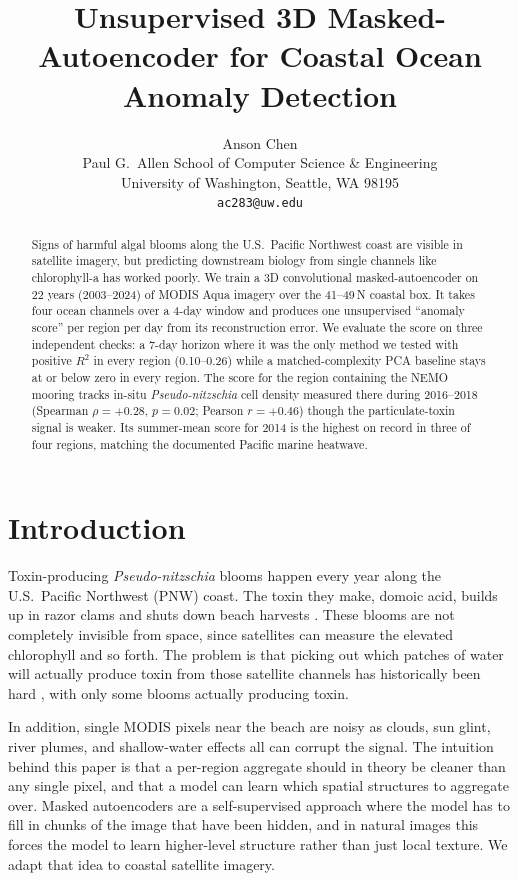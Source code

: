\documentclass[10pt,twocolumn,letterpaper]{article}
\title{Unsupervised 3D Masked-Autoencoder for Coastal Ocean Anomaly Detection}
\author{Anson Chen\\
Paul G.\ Allen School of Computer Science \& Engineering\\
University of Washington, Seattle, WA 98195\\
{\tt\small ac283@uw.edu}}
\begin{document}
\maketitle

\begin{abstract}
Signs of harmful algal blooms along the U.S.\ Pacific Northwest coast are visible in satellite imagery, but predicting downstream biology from single channels like chlorophyll-a has worked poorly. We train a 3D convolutional masked-autoencoder on 22 years (2003--2024) of MODIS Aqua imagery over the 41--49\textdegree\,N coastal box. It takes four ocean channels over a 4-day window and produces one unsupervised ``anomaly score'' per region per day from its reconstruction error. We evaluate the score on three independent checks: a 7-day horizon where it was the only method we tested with positive $R^2$ in every region (0.10--0.26) while a matched-complexity PCA baseline stays at or below zero in every region. The score for the region containing the NEMO mooring tracks in-situ \textit{Pseudo-nitzschia} cell density measured there during 2016--2018 (Spearman $\rho{=}{+}0.28$, $p{=}0.02$; Pearson $r{=}{+}0.46$) though the particulate-toxin signal is weaker. Its summer-mean score for 2014 is the highest on record in three of four regions, matching the documented Pacific marine heatwave.
\end{abstract}

\section{Introduction}
\label{sec:intro}

Toxin-producing \textit{Pseudo-nitzschia} blooms happen every year along the U.S.\ Pacific Northwest (PNW) coast. The toxin they make, domoic acid, builds up in razor clams and shuts down beach harvests \cite{Trainer2009,McCabe2023}. These blooms are not completely invisible from space, since satellites can measure the elevated chlorophyll and so forth. The problem is that picking out which patches of water will actually produce toxin from those satellite channels has historically been hard \cite{Anderson2016,Hill2020}, with only some blooms actually producing toxin.

In addition, single MODIS pixels near the beach are noisy as clouds, sun glint, river plumes, and shallow-water effects all can corrupt the signal. The intuition behind this paper is that a per-region aggregate should in theory be cleaner than any single pixel, and that a model can learn which spatial structures to aggregate over. Masked autoencoders \cite{He2022MAE} are a self-supervised approach where the model has to fill in chunks of the image that have been hidden, and in natural images this forces the model to learn higher-level structure rather than just local texture. We adapt that idea to coastal satellite imagery.
\end{document}

